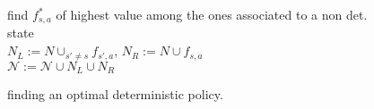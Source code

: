 \begin{figure}[h!]
{{{ \hspace*{3ex} \hspace*{3ex} \hspace*{3ex} find $f^*_{s,a}$ of highest value among the ones associated to a non det. state \\
 \hspace*{3ex} \hspace*{3ex} \hspace*{3ex} $N_L := N \cup_{s' \neq s} f_{s',a}$, $N_R := N \cup f_{s,a}$  \\
\hspace*{3ex} \hspace*{3ex} \hspace*{3ex} $\mathcal{N} := \mathcal{N} \cup N_L \cup N_R$
}}
\caption{finding an optimal deterministic policy.}
\label{fig:basic_bb}

}
\end{figure}
